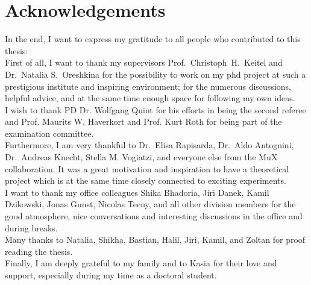 \chapter*{Acknowledgements}

In the end, I want to express my gratitude to all people who contributed to this thesis:\\
First of all, I want to thank my supervisors Prof.~Christoph~H.~Keitel and Dr.~Natalia S.~Oreshkina for the possibility to work on my phd project at such a prestigious institute and inspiring environment; for the numerous discussions, helpful advice, and at the same time enough space for following my own ideas.\\
I wish to thank PD Dr. Wolfgang Quint for his efforts in being the second referee and Prof. Maurits W. Haverkort and Prof. Kurt Roth for being part of the examination committee.\\
Furthermore, I am very thankful to Dr.~Elisa Rapisarda, Dr.~Aldo Antognini, Dr.~Andreas Knecht, Stella M. Vogiatzi, and everyone else from the MuX collaboration. It was a great motivation and inspiration to have a theoretical project which is at the same time closely connected to exciting experiments.\\
I want to thank my  office colleagues Shika Bhadoria, Jiri Danek, Kamil Dzikowski, Jonas Gunst, Nicolas Teeny, and all other division members for the good atmosphere, nice conversations and interesting discussions in the office and during breaks.\\
Many thanks to Natalia, Shikha, Bastian, Halil, Jiri, Kamil, and Zoltan for proof reading the thesis.\\
Finally, I am deeply grateful to my family and to Kasia for their love and support, especially during my time as a doctoral student.
%



